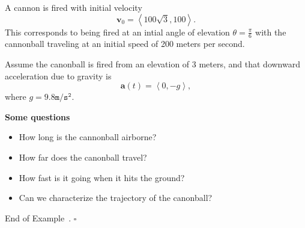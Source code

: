\documentclass[10pt]{article}
\theoremstyle{definition}
\newtheorem{example}[theorem]{Example}
\renewenvironment{example}
{\begin{oldexample}}
  {\par\smallskip\hfill   End of Example~\theexample. $\square$    \par\end{oldexample}}
\newcommand{\1}[1]{\textbf{1}_{\left[#1\right]}} %
\begin{document}
\begin{example}
  A cannon is fired with initial velocity
  \begin{equation*}
    \mathbf{v}_{0} = \left\langle 100 \sqrt{3},100 \right\rangle.
  \end{equation*}
  This corresponds to being fired at an intial angle of elevation $\theta=\frac{\pi}{6}$ with the
  cannonball traveling at an initial speed of 200 meters per second.

  \begin{center}
  \end{center}
  
  Assume the canonball is fired from
  an elevation of 3 meters, and that downward acceleration due to gravity is
  \begin{equation*}
    \mathbf{a}(t) = \left\langle 0,-g \right\rangle,
  \end{equation*}
  where $g= 9.8 \mathtt{m/s^{2}}$. 

  \textbf{Some questions}
  \begin{itemize}
    \item How long is the cannonball airborne?
    \item How far does the canonball travel?
    \item How fast is it going when it hits the ground?
    \item Can we characterize the trajectory of the canonball?
  \end{itemize}


\end{example}
\end{document}

